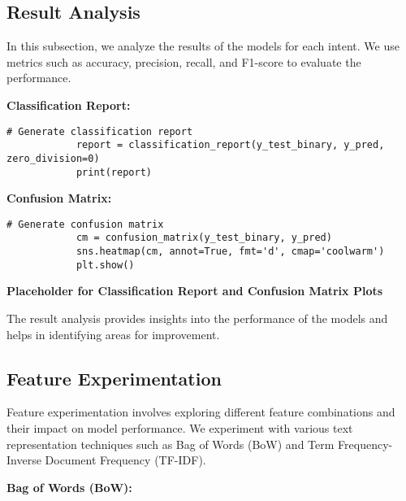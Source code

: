     \subsection{Result Analysis}
    
        In this subsection, we analyze the results of the models for each intent. We use metrics such as accuracy, precision, recall, and F1-score to evaluate the performance.

        \textbf{Classification Report:}
        
        \vspace{0.5em}

        \begin{lstlisting}[caption={Generate classification report}, label={lst:classification_report}]
            # Generate classification report
            report = classification_report(y_test_binary, y_pred, zero_division=0)
            print(report)
        \end{lstlisting}

        \textbf{Confusion Matrix:}
        
        \vspace{0.5em}

        \begin{lstlisting}[caption={Generate confusion matrix}, label={lst:confusion_matrix}]
            # Generate confusion matrix
            cm = confusion_matrix(y_test_binary, y_pred)
            sns.heatmap(cm, annot=True, fmt='d', cmap='coolwarm')
            plt.show()
        \end{lstlisting}

        \textbf{Placeholder for Classification Report and Confusion Matrix Plots}

        The result analysis provides insights into the performance of the models and helps in identifying areas for improvement.
            
    \subsection{Feature Experimentation}
    
        Feature experimentation involves exploring different feature combinations and their impact on model performance. We experiment with various text representation techniques such as Bag of Words (BoW) and Term Frequency-Inverse Document Frequency (TF-IDF).

        \textbf{Bag of Words (BoW):}
        
